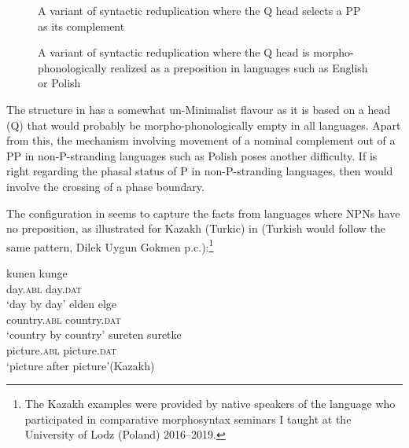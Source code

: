 \documentclass[output=paper]{langscibook}
\begin{document}
\vfill
\begin{figure}[H]\sloppy
\begin{floatrow}
  \captionsetup{margin=.05\linewidth}
    {\caption{A variant of syntactic reduplication where the Q head selects a PP as its complement\label{psk:fig:fig2}}}
    {\caption{A variant of syntactic reduplication where the Q head is morpho-phonologically realized as a preposition in languages such as English or Polish\label{psk:fig:fig3}}}
\end{floatrow}
\end{figure}
\vfill\pagebreak

The structure in  has a somewhat un-Minimalist flavour as it is based on a head (Q) that would probably be morpho-phonologically empty in all languages. Apart from this, the mechanism involving movement of a nominal complement out of a PP in non-P-stran\-ding languages such as Polish poses another difficulty. If \citet{Abels2003} is right regarding the phasal status of P in non-P-strand\-ing languages, then  would involve the crossing of a phase boundary.

The configuration in  seems to capture the facts from languages where NPNs have no preposition, as illustrated for Kazakh (Turkic) in  (Turkish would follow the same pattern, Dilek Uygun Gokmen p.c.):\footnote{The Kazakh examples were provided by native speakers of the language who participated in comparative morphosyntax seminars I taught at the University of Lodz (Poland) 2016--2019.}

\ea\label{psk:ex:key:16}\ea \gll kunen kunge\\
      day.\textsc{abl}   day.\textsc{dat}\\
\glt       ‘day by day’
\ex\gll  elden elge\\
      country.\textsc{abl}  country.\textsc{dat}\\
\glt      ‘country by country’
\ex\gll   sureten suretke\\
      picture.\textsc{abl}  picture.\textsc{dat}\\
\glt      ‘picture after picture’\hfill (Kazakh)
\z
\z
\end{document}
